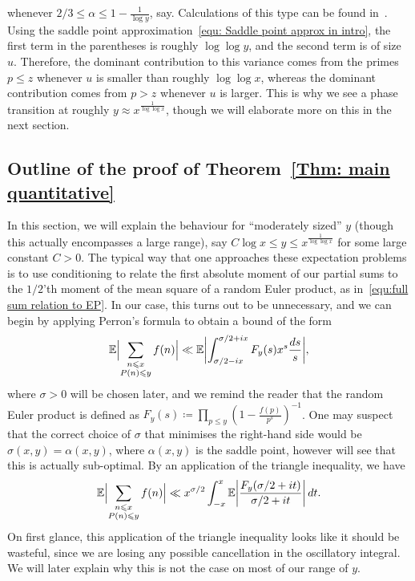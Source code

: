 \documentclass[12pt,a4paper,reqno]{amsart}
\numberwithin{equation}{section}
\def\E{\mathbb E}
\def\leq {\leqslant}
\theoremstyle{remark}
\theoremstyle{definition}
\numberwithin{equation}{section}
\theoremstyle{remark}
\def\E{\mathbb E}
\begin{document}
whenever $2/3 \leq \alpha \leq 1 - \frac{1}{\log y}$, say. Calculations of this type can be found in~\cite[Lemma~7.4]{MV2007}. Using the saddle point approximation~\eqref{equ: Saddle point approx in intro}, the first term in the parentheses is roughly $\log \log y$, and the second term is of size $u$. Therefore, the dominant contribution to this variance comes from the primes $p \leq z$ whenever $u$ is smaller than roughly $\log \log x$, whereas the dominant contribution comes from $p > z$ whenever $u$ is larger. This is why we see a phase transition at roughly $y \approx x^{\frac{1}{\log \log x}}$, though we will elaborate more on this in the next section.

\subsection{Outline of the proof of Theorem~\ref{Thm: main quantitative}}\label{s:outline of moderate y} 
In this section, we will explain the behaviour for ``moderately sized'' $y$ (though this actually encompasses a large range), say $C \log x \leq y \leq x^{\frac{1}{\log \log x}}$ for some large constant $C>0$. The typical way that one approaches these expectation problems is to use conditioning to relate the first absolute moment of our partial sums to the $1/2$'th moment of the mean square of a random Euler product, as in~\eqref{equ:full sum relation to EP}. In our case, this turns out to be unnecessary, and we can begin by applying Perron's formula to obtain a bound of the form
\begin{equation}\label{equ: Perron application}
\E \Bigl| \sum_{\substack{n \leq x \\ P(n) \leq y}} f(n) \Bigr| \ll \E \biggl| \int_{\sigma/2 - ix}^{\sigma/2 + ix} F_y (s) x^s \frac{ds}{s} \biggr|,
\end{equation}
where $\sigma > 0$ will be chosen later, and we remind the reader that the random Euler product is defined as $F_y(s) \coloneqq \prod_{p\leq y} (1-\frac{f(p)}{p^{s}})^{-1}$. One may suspect that the correct choice of $\sigma$ that minimises the right-hand side would be $\sigma (x,y) = \alpha(x,y)$, where $\alpha (x,y)$ is the saddle point, however will see that this is actually sub-optimal. By an application of the triangle inequality, we have
\begin{equation}\label{equ:triangle}
\E \Bigl| \sum_{\substack{n \leq x \\ P(n) \leq y}} f(n) \Bigr| \ll x^{\sigma/2} \int_{-x}^{x} \E \biggl| \frac{F_y (\sigma / 2 + it)}{\sigma / 2 + it} \biggr| \, dt . 
\end{equation}
On first glance, this application of the triangle inequality looks like it should be wasteful, since we are losing any possible cancellation in the oscillatory integral. We will later explain why this is not the case on most of our range of $y$. 
\end{document}
